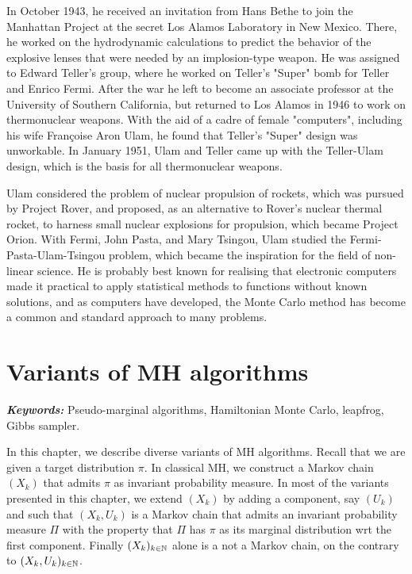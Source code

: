 \documentclass[english,graybox,envcountchap,envcountsame,sectrefs,shortlabels]{svmono}
\theoremstyle{style}
\renewenvironment{keywords}{\textit{\bf Keywords: } \sffamily }{}
\begin{document}
\begin{subappendices}
In October 1943, he received an invitation from Hans Bethe to join the Manhattan Project at the secret Los Alamos Laboratory in New Mexico. There, he worked on the hydrodynamic calculations to predict the behavior of the explosive lenses that were needed by an implosion-type weapon. He was assigned to Edward Teller's group, where he worked on Teller's "Super" bomb for Teller and Enrico Fermi. After the war he left to become an associate professor at the University of Southern California, but returned to Los Alamos in 1946 to work on thermonuclear weapons. With the aid of a cadre of female "computers", including his wife Fran\c{c}oise Aron Ulam, he found that Teller's "Super" design was unworkable. In January 1951, Ulam and Teller came up with the Teller-Ulam design, which is the basis for all thermonuclear weapons.

Ulam considered the problem of nuclear propulsion of rockets, which was pursued by Project Rover, and proposed, as an alternative to Rover's nuclear thermal rocket, to harness small nuclear explosions for propulsion, which became Project Orion. With Fermi, John Pasta, and Mary Tsingou, Ulam studied the Fermi-Pasta-Ulam-Tsingou problem, which became the inspiration for the field of non-linear science. He is probably best known for realising that electronic computers made it practical to apply statistical methods to functions without known solutions, and as computers have developed, the Monte Carlo method has become a common and standard approach to many problems.
\end{subappendices}

\chapter{Variants of MH algorithms}
\minitoc
\begin{keywords}
Pseudo-marginal algorithms, Hamiltonian Monte Carlo, leapfrog, Gibbs sampler.
\end{keywords}


In this chapter, we describe diverse variants of MH algorithms. Recall that we are given a target distribution $\pi$. In classical MH, we construct a Markov chain $(X_k)$ that admits $\pi$ as invariant probability  measure. In most of the variants presented in this chapter, we extend $(X_k)$ by adding a component, say $(U_k)$ and such that $(X_k,U_k)$ is a Markov chain that admits an invariant probability measure $\Pi$ with the property that $\Pi$ has $\pi$ as its marginal distribution wrt the first component.
Finally $(X_k)_{k\in\mathbb{N}}$ alone is a not a Markov chain, on the contrary to $(X_k,U_k)_{k\in\mathbb{N}}$.
\end{document}
